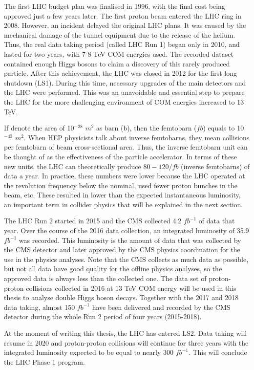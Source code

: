 \begin{normalsize}
The first LHC budget plan was finalised in 1996, with the final cost being approved just a few years later. The first proton beam entered the LHC ring in 2008. However, an incident delayed the original LHC plans. It was caused by the mechanical damage of the tunnel equipment due to the release of the helium. Thus, the real data taking period (called LHC Run 1) began only in 2010, and lasted for two years, with 7-8 TeV COM energies used. The recorded dataset contained enough Higgs bosons to claim a discovery of this rarely produced particle. After this achievement, the LHC was closed in 2012 for the first long shutdown (LS1). During this time, necessary upgrades of the main detectors and the LHC were performed. This was an unavoidable and essential step to prepare the LHC for the more challenging environment of COM energies increased to 13 TeV. 


If denote the area of 10$^{-28}$ $m^2$ as barn (b), then the femtobarn ($fb$) equals to 10$^{-43}$ $m^2$. When HEP physicists talk about inverse femtobarns, they mean collisions per femtobarn of beam cross-sectional area. Thus, the inverse femtobarn unit can be thought of as the effectiveness of the particle accelerator. In terms of these new units, the LHC can theoretically produce $80-120/fb$ (inverse femtobarns) of data a year. In practice, these numbers were lower because the LHC operated at the revolution frequency below the nominal, used fewer proton bunches in the beam, etc.  These resulted in lower than the expected instantaneous luminosity, an important term in collider physics that will be explained in the next section.


The LHC Run 2 started in 2015 and the CMS collected 4.2 $fb^{-1}$ of data that year. Over the course of the 2016 data collection, an integrated luminosity of 35.9 $fb^{-1}$ was recorded. This luminosity is the amount of data that was collected by the CMS detector and later approved by the CMS physics coordination for the use in the physics analyses. Note that the CMS collects as much data as possible, but not all data have good quality for the offline physics analyses, so the approved data is always less than the collected one. The data set of proton-proton collisions collected in 2016 at 13 TeV COM energy will be used in this thesis to analyse double Higgs boson decays. Together with the 2017 and 2018 data taking, almost 150 $fb^{-1}$ have been delivered and recorded by the CMS detector during the whole Run 2 period of four years (2015-2018). 


At the moment of writing this thesis, the LHC has entered LS2. Data taking will resume in 2020 and proton-proton collisions will continue for three years with the integrated luminosity expected to be equal to nearly 300 $fb^{-1}$. This will conclude the LHC Phase 1 program. 





\end{normalsize}
